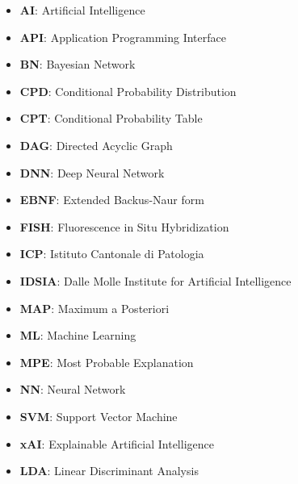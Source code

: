 \begin{itemize}
  \item \textbf{AI}: Artificial Intelligence
  \item \textbf{API}: Application Programming Interface
  \item \textbf{BN}: Bayesian Network
  \item \textbf{CPD}: Conditional Probability Distribution
  \item \textbf{CPT}: Conditional Probability Table
  \item \textbf{DAG}: Directed Acyclic Graph
  \item \textbf{DNN}: Deep Neural Network
  \item \textbf{EBNF}: Extended Backus-Naur form
  \item \textbf{FISH}: Fluorescence in Situ Hybridization
  \item \textbf{ICP}: Istituto Cantonale di Patologia
  \item \textbf{IDSIA}: Dalle Molle Institute for Artificial Intelligence
  \item \textbf{MAP}: Maximum a Posteriori
  \item \textbf{ML}: Machine Learning
  \item \textbf{MPE}: Most Probable Explanation
  \item \textbf{NN}: Neural Network
  \item \textbf{SVM}: Support Vector Machine
  \item \textbf{xAI}: Explainable Artificial Intelligence
  \item \textbf{LDA}: Linear Discriminant Analysis
\end{itemize}